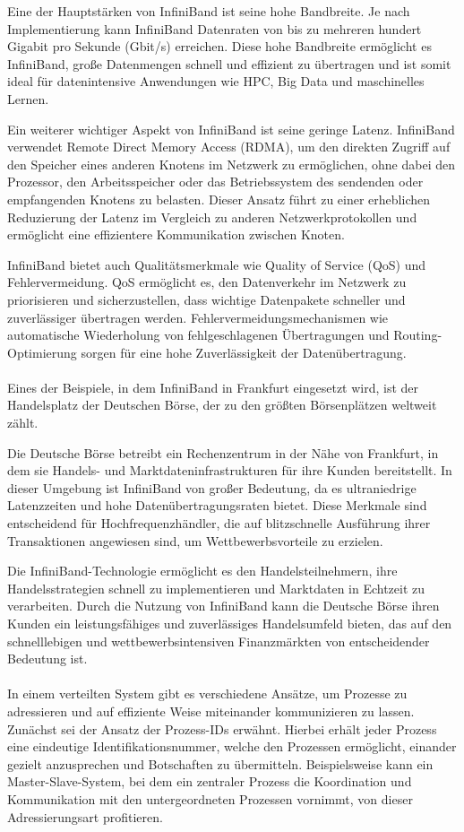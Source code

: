 \documentclass[../vs-script-first-v01.tex]{subfiles}
\begin{document}
Eine der Hauptstärken von InfiniBand ist seine hohe Bandbreite. Je nach Implementierung kann InfiniBand Datenraten von bis zu mehreren hundert Gigabit pro Sekunde (Gbit/s) erreichen. Diese hohe Bandbreite ermöglicht es InfiniBand, große Datenmengen schnell und effizient zu übertragen und ist somit ideal für datenintensive Anwendungen wie HPC, Big Data und maschinelles Lernen.

Ein weiterer wichtiger Aspekt von InfiniBand ist seine geringe Latenz. InfiniBand verwendet Remote Direct Memory Access (RDMA), um den direkten Zugriff auf den Speicher eines anderen Knotens im Netzwerk zu ermöglichen, ohne dabei den Prozessor, den Arbeitsspeicher oder das Betriebssystem des sendenden oder empfangenden Knotens zu belasten. Dieser Ansatz führt zu einer erheblichen Reduzierung der Latenz im Vergleich zu anderen Netzwerkprotokollen und ermöglicht eine effizientere Kommunikation zwischen Knoten.

InfiniBand bietet auch Qualitätsmerkmale wie Quality of Service (QoS) und Fehlervermeidung. QoS ermöglicht es, den Datenverkehr im Netzwerk zu priorisieren und sicherzustellen, dass wichtige Datenpakete schneller und zuverlässiger übertragen werden. Fehlervermeidungsmechanismen wie automatische Wiederholung von fehlgeschlagenen Übertragungen und Routing-Optimierung sorgen für eine hohe Zuverlässigkeit der Datenübertragung.
\\\\
Eines der Beispiele, in dem InfiniBand in Frankfurt eingesetzt wird, ist der Handelsplatz der Deutschen Börse, der zu den größten Börsenplätzen weltweit zählt.

Die Deutsche Börse betreibt ein Rechenzentrum in der Nähe von Frankfurt, in dem sie Handels- und Marktdateninfrastrukturen für ihre Kunden bereitstellt. In dieser Umgebung ist InfiniBand von großer Bedeutung, da es ultraniedrige Latenzzeiten und hohe Datenübertragungsraten bietet. Diese Merkmale sind entscheidend für Hochfrequenzhändler, die auf blitzschnelle Ausführung ihrer Transaktionen angewiesen sind, um Wettbewerbsvorteile zu erzielen.

Die InfiniBand-Technologie ermöglicht es den Handelsteilnehmern, ihre Handelsstrategien schnell zu implementieren und Marktdaten in Echtzeit zu verarbeiten. Durch die Nutzung von InfiniBand kann die Deutsche Börse ihren Kunden ein leistungsfähiges und zuverlässiges Handelsumfeld bieten, das auf den schnelllebigen und wettbewerbsintensiven Finanzmärkten von entscheidender Bedeutung ist.
\\\\
In einem verteilten System gibt es verschiedene Ansätze, um Prozesse zu adressieren und auf effiziente Weise miteinander kommunizieren zu lassen. Zunächst sei der Ansatz der Prozess-IDs erwähnt. Hierbei erhält jeder Prozess eine eindeutige Identifikationsnummer, welche den Prozessen ermöglicht, einander gezielt anzusprechen und Botschaften zu übermitteln. Beispielsweise kann ein Master-Slave-System, bei dem ein zentraler Prozess die Koordination und Kommunikation mit den untergeordneten Prozessen vornimmt, von dieser Adressierungsart profitieren.
\end{document}
